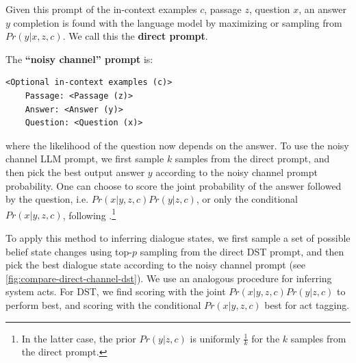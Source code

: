 \documentclass[11pt]{article}
\newcommand{\Ek}[0]{\mathcal{E}_k}
\newcommand{\C}[0]{\mathcal{C}}  %
\newcommand{\prompt}[0]{f_{\text{prompt}}}
\newcommand{\topP}[0]{\underset{\scalebox{.6}{\text{top-}p}}{\sim}}
\begin{document}
Given this prompt of the in-context examples $c$, passage $z$, question $x$, an answer $y$ completion is found with the language model by maximizing or sampling from $Pr(y|x,z,c)$.  We call this the \textbf{direct prompt}.

The \textbf{``noisy channel'' prompt} is:
\begin{Verbatim}[fontsize=\small]
    <Optional in-context examples (c)>
    Passage: <Passage (z)>
    Answer: <Answer (y)>
    Question: <Question (x)>
\end{Verbatim}
where the likelihood of the question now depends on the answer. 
To use the noisy channel LLM prompt, we first sample $k$ samples from the direct prompt, and then pick the best output answer $y$ according to the noisy channel prompt probability. 
One can choose to score the joint probability of the answer followed by the question, i.e. $Pr(x|y,z,c)Pr(y|z,c)$, or only the conditional $Pr(x|y,z,c)$, following \citet{min-etal-2022-noisy}.\footnote{In the latter case, the prior $Pr(y|z, c)$ is uniformly $\frac{1}{k}$ for the $k$ samples from the direct prompt.}

To apply this method to inferring dialogue states, we first sample a set of possible belief state changes using top-$p$ sampling \cite{holtzman_curious_2020} from the direct DST prompt, and then pick the best dialogue state according to the noisy channel prompt (see \autoref{fig:compare-direct-channel-dst}).  
We use an analogous procedure for inferring system acts.
For DST, we find scoring with the joint $Pr(x|y,z,c)Pr(y|z,c)$ to perform best, and scoring with the conditional $Pr(x|y,z,c)$ best for act tagging.

\end{document}
